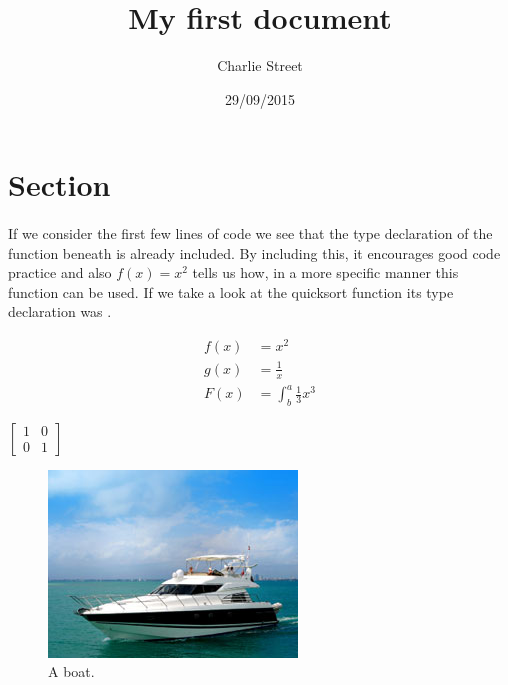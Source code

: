 \documentclass{article}
\title{My first document}
\date{29/09/2015}
\author{Charlie Street}
\begin{document}
    \maketitle
    \newpage
    
    \section{Section}
    
    \paragraph{}
        If we consider the first few lines of code we see that the type declaration of the function beneath is already included. By including this, it encourages good code practice and also $f(x) = x^2$ tells us how, in a more specific manner this function can be used. If we take a look at the quicksort function its type declaration was . 

	 \begin{align*} %
  		f(x) &= x^2 \\
		g(x) &= \frac{1}{x}\\
		F(x) &= \int^a_b \frac{1}{3}x^3 %
	\end{align*}

	$\left[
	\begin{matrix}
		1 & 0\\
		0 & 1
	\end{matrix}
	\right]$
   
	\begin{figure} [h!]   %
 		 \includegraphics[width=\linewidth]{boat.jpg} %
  		\caption{A boat.}    %
  		\label{fig:boat1}   %
	\end{figure}
\end{document}
